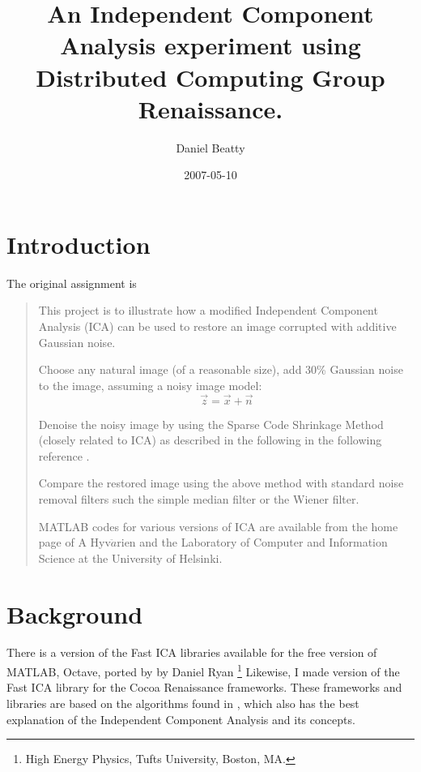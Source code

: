 \documentclass[12pt ]{article}
\title{An Independent Component Analysis experiment using Distributed Computing Group Renaissance.}
\author{ Daniel Beatty }
\date{2007-05-10}
\begin{document}
\maketitle


\begin{abstract}
\end{abstract}

\section{Introduction} %
\label{sec:introduction}

The original assignment is 
\begin{quote}
	This project is to illustrate how a modified Independent Component Analysis (ICA) can be used to restore an image corrupted with additive Gaussian noise.    

	Choose any natural image (of a reasonable size), add 30\% Gaussian noise to the image, assuming a noisy image model:
	\begin{equation}
	\vec{z} = \vec{x} + \vec{n}
	\end{equation}
	
	Denoise the noisy image by using the Sparse Code Shrinkage Method (closely related to ICA) as described in the following in the following reference \cite{hyvarinen99sparse}. 
	
	Compare the restored image using the above method with standard noise removal filters such the simple median filter or the Wiener filter. 
	
	MATLAB codes for various versions of ICA are available from the home page of A Hyv$\ddot{a}$rien and the Laboratory of Computer and Information Science at the University of Helsinki. 
\end{quote}



\section{Background} %
\label{sec:background}

There is a version of the Fast ICA libraries available for the free version of MATLAB, Octave, ported by by Daniel Ryan \footnote{High Energy Physics, Tufts University, Boston, MA.}   Likewise, I made version of the Fast ICA library for the Cocoa Renaissance frameworks.  These frameworks and libraries are based on the algorithms found in \cite{appo-ica-book}, which also has the best explanation of the Independent Component Analysis and its concepts.   
\end{document}
